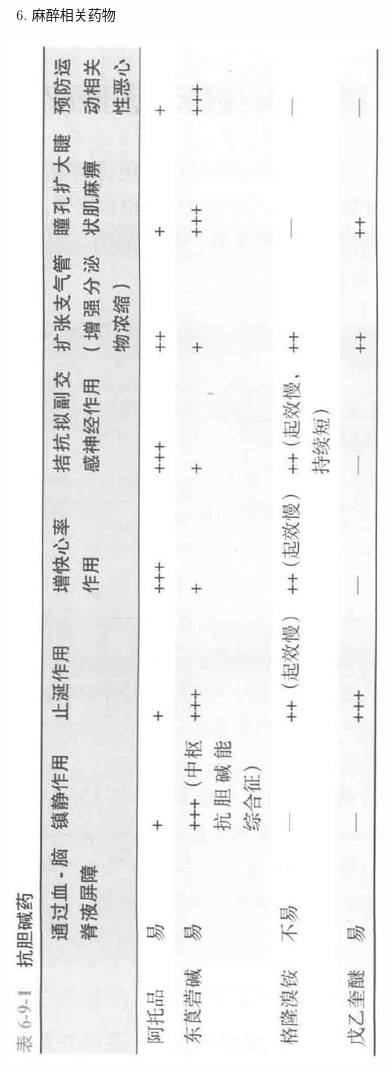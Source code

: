 \documentclass[10pt]{article}
\begin{document}
\begin{enumerate}
  \setcounter{enumi}{5}
  \item 麻醉相关药物
\end{enumerate}

\begin{center}
\includegraphics[max width=\textwidth]{2024_07_05_645bb794a4d4f32ee0c8g-345}
\end{center}
\end{document}

